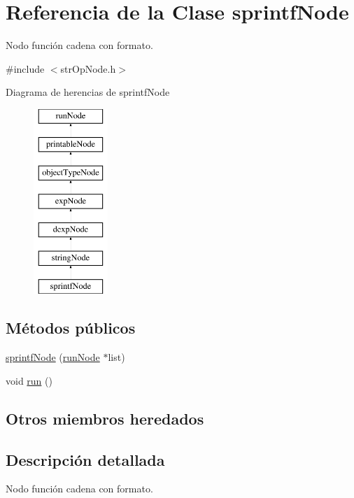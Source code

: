 \hypertarget{classsprintfNode}{\section{Referencia de la Clase sprintf\-Node}
\label{classsprintfNode}
}


Nodo función cadena con formato.  




{\ttfamily \#include $<$str\-Op\-Node.\-h$>$}

Diagrama de herencias de sprintf\-Node\begin{figure}[H]
\begin{center}
\leavevmode
\includegraphics[height=7.000000cm]{classsprintfNode}
\end{center}
\end{figure}
\subsection*{Métodos públicos}
\begin{DoxyCompactItemize}
\item 
\hyperlink{classsprintfNode_ac4cf673616622fb93d647cf3c05e68aa}{sprintf\-Node} (\hyperlink{classrunNode}{run\-Node} $\ast$list)
\item 
void \hyperlink{classsprintfNode_ad572656a67da5d4df98bce0eeb2affd5}{run} ()
\end{DoxyCompactItemize}
\subsection*{Otros miembros heredados}


\subsection{Descripción detallada}
Nodo función cadena con formato. 

